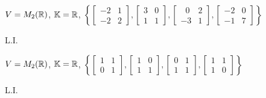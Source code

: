 \documentclass[12pt]{exam}
\begin{document}
    \begin{exercicio}
        $V = M_2(\mathbb{R})$, $\mathbb{K} = \mathbb{R}$,
        $
            \left\{
                \begin{bmatrix}
                    -2 & 1\\
                    -2 & 2
                \end{bmatrix},
                \begin{bmatrix}
                    3 & 0\\
                    1 & 1
                \end{bmatrix},
                \begin{bmatrix}
                    \phantom{x} 0 & 2\\
                    -3 & 1
                \end{bmatrix},
                \begin{bmatrix}
                    -2 & 0\\
                    -1 & 7
                \end{bmatrix}
            \right\}
        $
        \begin{solucao}
            L.I.
        \end{solucao}
    \end{exercicio}

    \begin{exercicio}
        $V = M_2(\mathbb{R})$, $\mathbb{K} = \mathbb{R}$,
        $
            \left\{
                \begin{bmatrix}
                    1 & 1\\
                    0 & 1
                \end{bmatrix},
                \begin{bmatrix}
                    1 & 0\\
                    1 & 1
                \end{bmatrix},
                \begin{bmatrix}
                    0 & 1\\
                    1 & 1
                \end{bmatrix},
                \begin{bmatrix}
                    1 & 1\\
                    1 & 0
                \end{bmatrix}
            \right\}
        $
        \begin{solucao}
            L.I.
        \end{solucao}
    \end{exercicio}
    
\end{document}

